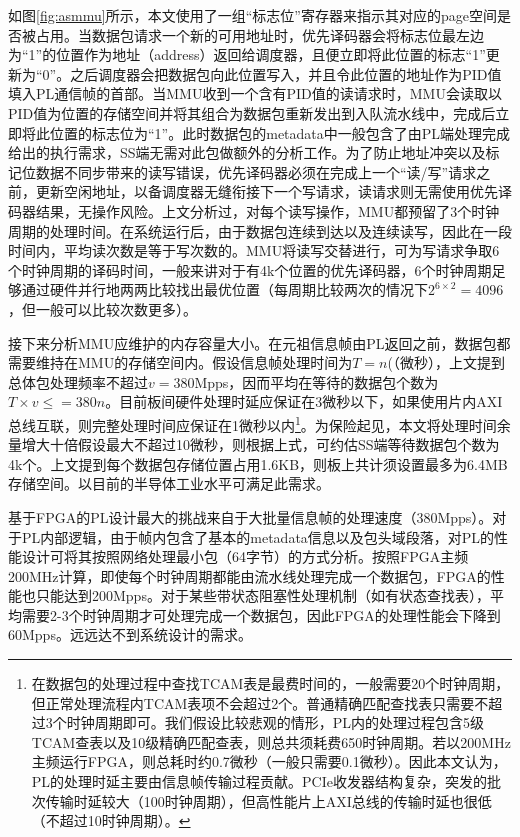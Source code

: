 如图\ref{fig:asmmu}所示，本文使用了一组“标志位”寄存器来指示其对应的page空间是否被占用。当数据包请求一个新的可用地址时，优先译码器会将标志位最左边为“1”的位置作为地址（address）返回给调度器，且便立即将此位置的标志“1”更新为“0”。之后调度器会把数据包向此位置写入，并且令此位置的地址作为PID值填入PL通信帧的首部。当MMU收到一个含有PID值的读请求时，MMU会读取以PID值为位置的存储空间并将其组合为数据包重新发出到入队流水线中，完成后立即将此位置的标志位为“1”。此时数据包的metadata中一般包含了由PL端处理完成给出的执行需求，SS端无需对此包做额外的分析工作。为了防止地址冲突以及标记位数据不同步带来的读写错误，优先译码器必须在完成上一个“读/写”请求之前，更新空闲地址，以备调度器无缝衔接下一个写请求，读请求则无需使用优先译码器结果，无操作风险。上文分析过，对每个读写操作，MMU都预留了3个时钟周期的处理时间。在系统运行后，由于数据包连续到达以及连续读写，因此在一段时间内，平均读次数是等于写次数的。MMU将读写交替进行，可为写请求争取6个时钟周期的译码时间，一般来讲对于有4k个位置的优先译码器，6个时钟周期足够通过硬件并行地两两比较找出最优位置（每周期比较两次的情况下$2^{6\times2}=4096$，但一般可以比较次数更多）。

接下来分析MMU应维护的内存容量大小。在元祖信息帧由PL返回之前，数据包都需要维持在MMU的存储空间内。假设信息帧处理时间为$T=n$(（微秒），上文提到总体包处理频率不超过$v=$380Mpps，因而平均在等待的数据包个数为$T \times v \leq =380n$。目前板间硬件处理时延应保证在3微秒以下，如果使用片内AXI总线互联，则完整处理时间应保证在1微秒以内\footnote{在数据包的处理过程中查找TCAM表是最费时间的，一般需要20个时钟周期，但正常处理流程内TCAM表项不会超过2个。普通精确匹配查找表只需要不超过3个时钟周期即可。我们假设比较悲观的情形，PL内的处理过程包含5级TCAM查表以及10级精确匹配查表，则总共须耗费650时钟周期。若以200MHz主频运行FPGA，则总耗时约0.7微秒（一般只需要0.1微秒）。因此本文认为，PL的处理时延主要由信息帧传输过程贡献。PCIe收发器结构复杂，突发的批次传输时延较大（100时钟周期），但高性能片上AXI总线的传输时延也很低（不超过10时钟周期）。}。为保险起见，本文将处理时间余量增大十倍假设最大不超过10微秒，则根据上式，可约估SS端等待数据包个数为4k个。上文提到每个数据包存储位置占用1.6KB，则板上共计须设置最多为6.4MB存储空间。以目前的半导体工业水平可满足此需求。 



\label{chap443}

基于FPGA的PL设计最大的挑战来自于大批量信息帧的处理速度（380Mpps）。对于PL内部逻辑，由于帧内包含了基本的metadata信息以及包头域段落，对PL的性能设计可将其按照网络处理最小包（64字节）的方式分析。按照FPGA主频200MHz计算，即使每个时钟周期都能由流水线处理完成一个数据包，FPGA的性能也只能达到200Mpps。对于某些带状态阻塞性处理机制（如有状态查找表），平均需要2-3个时钟周期才可处理完成一个数据包，因此FPGA的处理性能会下降到60Mpps。远远达不到系统设计的需求。

